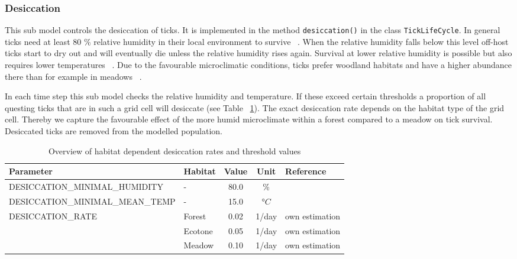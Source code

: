 \documentclass[a4paper, 11pt]{scrartcl}
\newcommand{\inlinecode}[1]{\texttt{\small #1}}
\begin{document}
\subsubsection{Desiccation}
This sub model controls the desiccation of ticks. It is implemented in the method \inlinecode{desiccation()} in the class \inlinecode{TickLifeCycle}. In general ticks need at least 80 \% relative humidity in their local environment to survive ~\parencite{Medlock.2013, Gray.2016, Hauser.2018}. When the relative humidity falls below this level off-host ticks start to dry out and will eventually die unless the relative humidity rises again. Survival at lower relative humidity is possible but also requires lower temperatures ~\parencite{Ostfeld.2015}. Due to the favourable microclimatic conditions, ticks prefer woodland habitats and have a higher abundance there than for example in meadows ~\parencite{Lindstrom.2003, Boehnke.2015}.

In each time step this sub model checks the relative humidity and temperature. If these exceed certain thresholds a proportion of all questing ticks that are in such a grid cell will desiccate (see Table ~\ref{tab:desiccation_parameters}). The exact desiccation rate depends on the habitat type of the grid cell. Thereby we capture the favourable effect of the more humid microclimate within a forest compared to a meadow on tick survival. Desiccated ticks are removed from the modelled population.

\begin{table}[h!]
\caption[Overview of habitat-dependent desiccation rates and threshold values.]{Overview of habitat dependent desiccation rates and threshold values}
\label{tab:desiccation_parameters}
\begin{tabularx}{\textwidth}{llccl}
\toprule
\textbf{Parameter}							& \textbf{Habitat}  & \textbf{Value} & \textbf{Unit}	& \textbf{Reference} \\
\midrule
\multirow{3}{*}{\tiny{DESICCATION\_MINIMAL\_HUMIDITY}} 	& \multirow{3}{*}{-} & \multirow{3}{*}{80.0} & \multirow{3}{*}{\%} &  \textcite{Medlock.2013} \\
													   	& 					 & 						 &					   &  \textcite{Gray.2016}	\\
														& 					 & 						 &					   &  \textcite{Hauser.2018} \\
\tiny{DESICCATION\_MINIMAL\_MEAN\_TEMP} 	& -    			 		 &   15.0  & $°C$  &  \cite{Ostfeld.2015} \\
\multirow{3}{*}{\tiny{DESICCATION\_RATE}}  	& Forest       			 &   0.02  & 1/day 	& own estimation \\
				 							& Ecotone 				 &   0.05  & 1/day  & own estimation \\
				 							& Meadow    			 &   0.10  & 1/day  & own estimation \\
\bottomrule
\end{tabularx}
\end{table}
\end{document}
